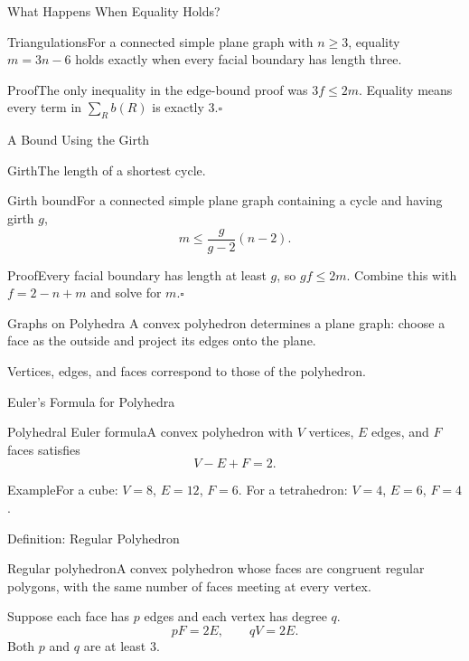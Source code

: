 \documentclass[aspectratio=169,11pt]{beamer}
\newcommand{\Def}[2]{\begin{block}{#1}#2\end{block}}
\newcommand{\Thm}[2]{\begin{block}{#1}#2\end{block}}
\renewcommand{\Proof}[1]{\begin{block}{Proof}\normalsize #1\end{block}}
\renewcommand{\Example}[1]{\begin{block}{Example}#1\end{block}}
\newcommand{\gap}{\par\medskip}
\begin{document}
\begin{frame}{What Happens When Equality Holds?}
\large
\Thm{Triangulations}{For a connected simple plane graph with $n\ge3$, equality $m=3n-6$ holds exactly when every facial boundary has length three.}
\Proof{The only inequality in the edge-bound proof was $3f\le2m$. Equality means every term in $\sum_R b(R)$ is exactly $3$.\hfill$\square$}
\end{frame}
\begin{frame}{A Bound Using the Girth}
\large
\Def{Girth}{The length of a shortest cycle.}
\Thm{Girth bound}{For a connected simple plane graph containing a cycle and having girth $g$,\[m\le\frac{g}{g-2}(n-2).\]}
\Proof{Every facial boundary has length at least $g$, so $gf\le2m$. Combine this with $f=2-n+m$ and solve for $m$.\hfill$\square$}
\end{frame}
\begin{frame}{Graphs on Polyhedra}
\large
A convex polyhedron determines a plane graph: choose a face as the outside and project its edges onto the plane.
\begin{center}\end{center}
\gap Vertices, edges, and faces correspond to those of the polyhedron.
\end{frame}
\begin{frame}{Euler's Formula for Polyhedra}
\large
\Thm{Polyhedral Euler formula}{A convex polyhedron with $V$ vertices, $E$ edges, and $F$ faces satisfies\[V-E+F=2.\]}
\Example{For a cube: $V=8$, $E=12$, $F=6$. For a tetrahedron: $V=4$, $E=6$, $F=4$.}
\end{frame}
\begin{frame}{Definition: Regular Polyhedron}
\large
\Def{Regular polyhedron}{A convex polyhedron whose faces are congruent regular polygons, with the same number of faces meeting at every vertex.}
Suppose each face has $p$ edges and each vertex has degree $q$.
\[pF=2E,\qquad qV=2E.\]
Both $p$ and $q$ are at least $3$.
\end{frame}
\end{document}
